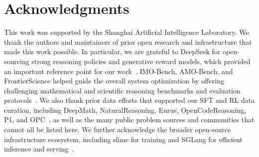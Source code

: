 \section*{Acknowledgments}
This work was supported by the Shanghai Artificial Intelligence Laboratory. 
We thank the authors and maintainers of prior open research and infrastructure
that made this work possible. 
In particular, we are
grateful to DeepSeek for open-sourcing strong reasoning policies and generative reward models, which provided an important
reference point for our work~\citep{deepseekai2025deepseekv32,deepseekmathv2}.
IMO-Bench, AMO-Bench, and FrontierScience
helped guide the overall system optimization by offering challenging
mathematical and scientific reasoning benchmarks and evaluation
protocols~\citep{luong2025imobench,an2025amobench,wang2026frontierscience}. We
also thank prior data efforts that supported our SFT and RL data curation,
including DeepMath, NaturalReasoning, Eurus, OpenCodeReasoning, P1, and
OPC~\citep{he2025deepmath,yuan2025naturalreasoning,cui2025process,ahmad2025opencodereasoning,chen2025p1,dekoninck2025opc},
as well as the many public problem sources and communities that cannot all be
listed here. We further acknowledge the broader open-source infrastructure
ecosystem, including slime for training and SGLang for efficient inference and
serving~\citep{thudm2026slime,sglang2026repo}. 

